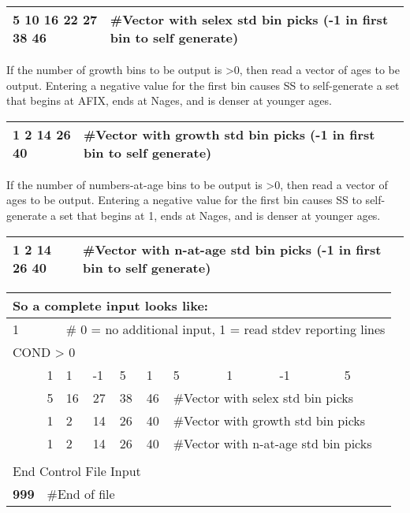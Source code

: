 \begin{center}
	\begin{tabular}{p{4cm} p{12cm}}
		\hline
		5 10 16 22 27 38 46 & \#Vector with selex std bin picks (-1 in first bin to self generate)\\
		\hline
	\end{tabular}
\end{center}
If the number of growth bins to be output is >0, then read a vector of ages to be output.  Entering a negative value for the first bin causes SS to self-generate a set that begins at AFIX, ends at Nages, and is denser at younger ages.
\begin{center}
	\begin{tabular}{p{4cm} p{12cm}}
		\hline
		1 2 14 26 40 & \#Vector with growth std bin picks (-1 in first bin to self generate)\\
		\hline
	\end{tabular}
\end{center}
If the number of numbers-at-age bins to be output is >0, then read a vector of ages to be output.  Entering a negative value for the first bin causes SS to self-generate a set that begins at 1, ends at Nages, and is denser at younger ages.
\begin{center}
	\begin{tabular}{p{4cm} p{12cm}}
		\hline
		1 2 14 26 40 & \#Vector with n-at-age std bin picks (-1 in first bin to self generate)\\
		\hline
	\end{tabular}
\end{center}

\begin{center}
	\begin{longtable}{p{1cm} p{1cm} p{1cm} p{1cm} p{1cm} p{1cm} p{1cm} p{1cm} p{1cm} p{3.5cm}}

		\multicolumn{10}{l}{So a complete input looks like:}\\
		\hline
		1 & & \multicolumn{8}{l}{\# 0 = no additional input, 1 = read stdev reporting lines}\\
		\hline
		\multicolumn{10}{l}{COND > 0}\\
		& 1 & 1 & -1 & 5 & 1 & 5 & 1 & -1 & 5 \\
		& 5 & 16 & 27 & 38 & 46 & \multicolumn{4}{l}{\#Vector with selex std bin picks}\\
		& 1 & 2 & 14 & 26 & 40 & \multicolumn{4}{l}{\#Vector with growth std bin picks}\\
		& 1 & 2 & 14 & 26 & 40 & \multicolumn{4}{l}{\#Vector with n-at-age std bin picks}\\
		\hline
		\\
		\multicolumn{10}{l}{End Control File Input}\\
		\bfseries{999} & \multicolumn{9}{l}{\#End of file}
	\end{longtable}
\end{center}

